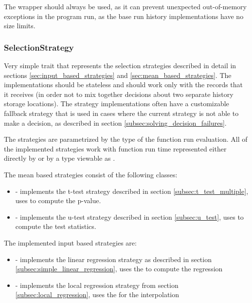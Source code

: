 The  wrapper should always be used, as it can prevent unexpected out-of-memory exceptions in the program run, as the base run history implementations have no size limits.

\subsubsection{SelectionStrategy}

Very simple trait that represents the selection strategies described in detail in sections \ref{sec:input_based_strategies} and \ref{sec:mean_based_strategies}. The implementations should be stateless and should work only with the  records that it receives (in order not to mix together decisions about two separate history storage locations). The strategy implementations often have a customizable fallback strategy that is used in cases where the current strategy is not able to make a decision, as described in section \ref{subsec:solving_decision_failures}.

The strategies are parametrized by the  type of the function run evaluation. All of the implemented strategies work with function run time represented either directly by  or by a type viewable as .

The mean based strategies consist of the following classes:
\begin{itemize}
	\item {} - implements the t-test strategy described in section \ref{subsec:t_test_multiple}, uses \cite{noauthor_apachemath_nodate} to compute the p-value.
	\item {} - implements the u-test strategy described in section \ref{subsec:u_test}, uses \cite{noauthor_apachemath_nodate} to compute the test statistics.
\end{itemize}

The implemented input based strategies are:
\begin{itemize}
	\item {} - implements the linear regression strategy as described in section \ref{subsec:simple_linear_regression}, uses the \cite{noauthor_apachemath_nodate} to compute the regression

	\item {} - implements the local regression strategy from section \ref{subsec:local_regression}, uses the \cite{noauthor_apachemath_nodate} for the interpolation
\end{itemize}

